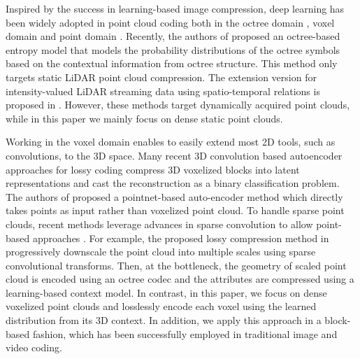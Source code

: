 \par Inspired by the success in learning-based image compression, deep learning has been widely adopted in point cloud coding  both in the octree domain \cite{huang2020octsqueeze,biswas2020muscle},  voxel domain \cite{8954537,9191021,quach2019learning,quach2020improved,wang2019learned,guarda2020point}  and point domain \cite{yan2019deep,huang20193d, wang2020multiscale}. Recently, the authors of \cite{huang2020octsqueeze} proposed an octree-based entropy model that models the probability distributions of the octree symbols based on the contextual information from octree structure. This method only targets static LiDAR point cloud compression. The extension version for intensity-valued LiDAR streaming data using spatio-temporal relations is proposed in \cite{biswas2020muscle}. However, these methods target dynamically acquired point clouds, while in this paper we mainly focus on dense static point clouds.
\par Working in the voxel domain enables to easily extend most 2D tools, such as convolutions, to the 3D space. 
Many recent 3D convolution based autoencoder approaches for lossy coding \cite{quach2019learning,quach2020improved,wang2019learned,guarda2020point} compress 3D voxelized blocks into latent representations and cast the reconstruction as a binary classification problem. The authors of \cite{yan2019deep} proposed a pointnet-based auto-encoder method which directly takes points as input rather than voxelized point cloud.  To handle sparse point clouds, recent methods leverage advances in sparse convolution \cite{choy20194d,graham2017submanifold} to allow point-based approaches  \cite{huang20193d, wang2020multiscale}. For example, the proposed lossy compression method in \cite{wang2020multiscale} progressively downscale the point cloud into multiple scales using sparse convolutional transforms. Then, at the bottleneck, the geometry of scaled point cloud is encoded using an octree codec and the attributes are compressed using a learning-based context model.  In contrast, in this paper, we focus on dense voxelized point clouds and losslessly encode each voxel using  the learned distribution from its 3D context. In addition, we apply this approach in a block-based fashion, which has been successfully employed in traditional image and video coding.

